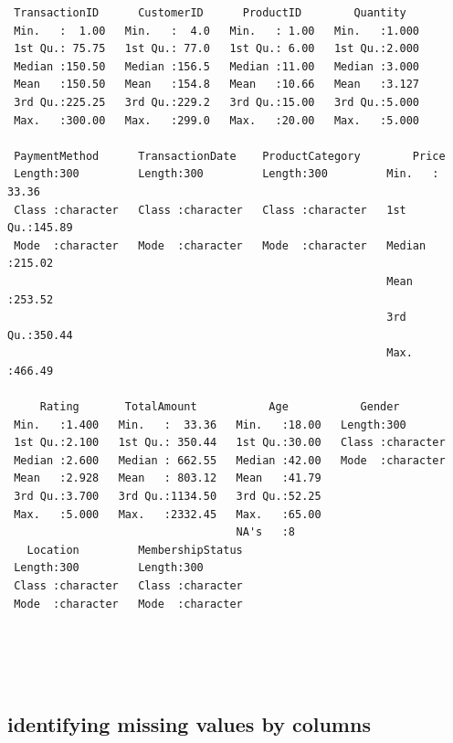 \documentclass[
]{article}
\begin{document}
\begin{verbatim}
 TransactionID      CustomerID      ProductID        Quantity    
 Min.   :  1.00   Min.   :  4.0   Min.   : 1.00   Min.   :1.000  
 1st Qu.: 75.75   1st Qu.: 77.0   1st Qu.: 6.00   1st Qu.:2.000  
 Median :150.50   Median :156.5   Median :11.00   Median :3.000  
 Mean   :150.50   Mean   :154.8   Mean   :10.66   Mean   :3.127  
 3rd Qu.:225.25   3rd Qu.:229.2   3rd Qu.:15.00   3rd Qu.:5.000  
 Max.   :300.00   Max.   :299.0   Max.   :20.00   Max.   :5.000  
                                                                 
 PaymentMethod      TransactionDate    ProductCategory        Price       
 Length:300         Length:300         Length:300         Min.   : 33.36  
 Class :character   Class :character   Class :character   1st Qu.:145.89  
 Mode  :character   Mode  :character   Mode  :character   Median :215.02  
                                                          Mean   :253.52  
                                                          3rd Qu.:350.44  
                                                          Max.   :466.49  
                                                                          
     Rating       TotalAmount           Age           Gender         
 Min.   :1.400   Min.   :  33.36   Min.   :18.00   Length:300        
 1st Qu.:2.100   1st Qu.: 350.44   1st Qu.:30.00   Class :character  
 Median :2.600   Median : 662.55   Median :42.00   Mode  :character  
 Mean   :2.928   Mean   : 803.12   Mean   :41.79                     
 3rd Qu.:3.700   3rd Qu.:1134.50   3rd Qu.:52.25                     
 Max.   :5.000   Max.   :2332.45   Max.   :65.00                     
                                   NA's   :8                         
   Location         MembershipStatus  
 Length:300         Length:300        
 Class :character   Class :character  
 Mode  :character   Mode  :character  
                                      
                                      
                                      
                                      
\end{verbatim}

\subsection{identifying missing values by
columns}\label{identifying-missing-values-by-columns}
\end{document}
